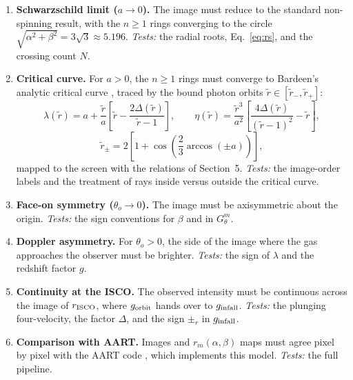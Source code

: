 \documentclass[11pt]{article}
\begin{document}
\begin{enumerate}
  \item \textbf{Schwarzschild limit ($a \to 0$).} The image must reduce to the
        standard non-spinning result, with the $n \ge 1$ rings converging to
        the circle $\sqrt{\alpha^2 + \beta^2} = 3\sqrt{3} \approx 5.196$.
        \emph{Tests:} the radial roots, Eq.~\eqref{eq:rs}, and the crossing
        count $N$.
  \item \textbf{Critical curve.} For $a > 0$, the $n \ge 1$ rings must
        converge to Bardeen's analytic critical curve \cite{Bardeen1973},
        traced by the bound photon orbits $\tilde r \in [\tilde r_-, \tilde r_+]$:
        \begin{equation}
        \lambda(\tilde r) = a + \frac{\tilde r}{a}\left[\tilde r - \frac{2\Delta(\tilde r)}{\tilde r - 1}\right],
        \qquad
        \eta(\tilde r) = \frac{\tilde r^3}{a^2}\left[\frac{4\Delta(\tilde r)}{(\tilde r - 1)^2} - \tilde r\right],
        \end{equation}
        \begin{equation}
        \tilde r_\pm = 2\left[1 + \cos\!\left(\frac23\arccos(\pm a)\right)\right],
        \end{equation}
        mapped to the screen with the relations of Section~5.
        \emph{Tests:} the image-order labels and the treatment of rays inside
        versus outside the critical curve.
  \item \textbf{Face-on symmetry ($\theta_o \to 0$).} The image must be
        axisymmetric about the origin.
        \emph{Tests:} the sign conventions for $\beta$ and in $G_\theta^m$.
  \item \textbf{Doppler asymmetry.} For $\theta_o > 0$, the side of the image
        where the gas approaches the observer must be brighter.
        \emph{Tests:} the sign of $\lambda$ and the redshift factor $g$.
  \item \textbf{Continuity at the ISCO.} The observed intensity must be
        continuous across the image of $r_{\rm ISCO}$, where $g_{\rm orbit}$
        hands over to $g_{\rm infall}$.
        \emph{Tests:} the plunging four-velocity, the factor $\Delta$, and the
        sign $\pm_r$ in $g_{\rm infall}$.
  \item \textbf{Comparison with AART.} Images and $r_m(\alpha,\beta)$ maps must
        agree pixel by pixel with the AART code \cite{AART2023}, which
        implements this model.
        \emph{Tests:} the full pipeline.
\end{enumerate}
\end{document}
